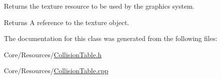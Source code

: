 Returns the texture resource to be used by the graphics system. 

\begin{DoxyReturn}{Returns}
A reference to the texture object. 
\end{DoxyReturn}


The documentation for this class was generated from the following files\-:\begin{DoxyCompactItemize}
\item 
Core/\-Resources/\hyperlink{CollisionTable_8h}{Collision\-Table.\-h}\item 
Core/\-Resources/\hyperlink{CollisionTable_8cpp}{Collision\-Table.\-cpp}\end{DoxyCompactItemize}
